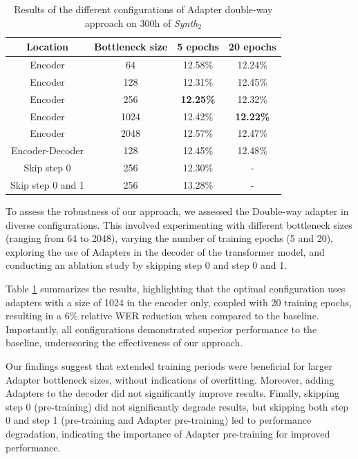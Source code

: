 \begin{table}[t]
\centering
\begin{tabular}{cccc}
\hline
 Location &  Bottleneck size &  5 epochs &  20 epochs     \\ \hline
\multicolumn{1}{c}{Encoder} & 64 & 12.58\% & 12.24\% \\ 
\multicolumn{1}{c}{Encoder} & 128 &  12.31\% & 12.45\%  \\ 
\multicolumn{1}{c}{Encoder} & 256  & \textbf{12.25\%} & 12.32\%  \\ 
\multicolumn{1}{c}{Encoder} & 1024 & 12.42\% & \textbf{12.22\%} \\ 
\multicolumn{1}{c}{Encoder} & 2048 & 12.57\% & 12.47\% \\ \hline
\multicolumn{1}{c}{Encoder-Decoder} & 128 & 12.45\% & 12.48\% \\ \hline
\multicolumn{1}{c}{Skip step 0} & 256 & 12.30\% & - \\ 
\multicolumn{1}{c}{Skip step 0 and 1} & 256 & 13.28\% & - \\ \hline

\end{tabular}

\caption{Results of the different configurations of Adapter double-way approach on 300h of \textit{Synth$_2$}}
\label{tab:config}
\end{table}

To assess the robustness of our approach, we assessed the Double-way adapter in diverse configurations. This involved experimenting with different bottleneck sizes (ranging from 64 to 2048), varying the number of training epochs (5 and 20), exploring the use of Adapters in the decoder of the transformer model, and conducting an ablation study by skipping step 0 and step 0 and 1.

Table \ref{tab:config} summarizes the results, highlighting that the optimal configuration uses adapters with a size of 1024 in the encoder only, coupled with 20 training epochs, resulting in a  6\% relative WER reduction when compared to the baseline. Importantly, all configurations demonstrated superior performance to the baseline, underscoring the effectiveness of our approach.

Our findings suggest that extended training periods were beneficial for larger Adapter bottleneck sizes, without indications of overfitting. Moreover, adding Adapters to the decoder did not significantly improve results. Finally, skipping step 0 (pre-training) did not significantly degrade results, but skipping both step 0 and step 1 (pre-training and Adapter pre-training) led to performance degradation, indicating the importance of Adapter pre-training for improved performance.


